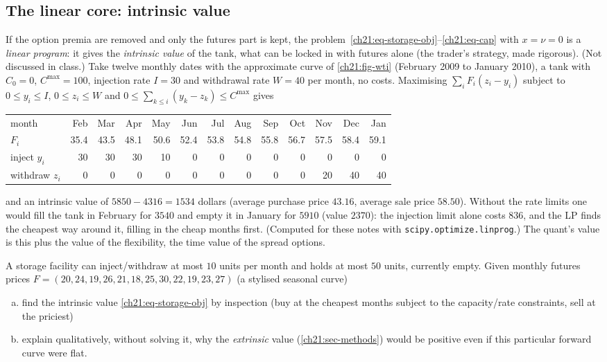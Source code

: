 \begin{paracol}{2}
\subsection{The linear core: intrinsic value}\label{ch21:sec-intrinsic}
If the option premia are removed and only the futures part is kept, the problem~\eqref{ch21:eq-storage-obj}--\eqref{ch21:eq-cap} with $x=\nu=0$ is a \emph{linear program}: it gives the \emph{intrinsic value} of the tank, what can be locked in with futures alone
(the trader's strategy, made rigorous). (Not discussed in class.) Take twelve monthly dates with the approximate curve of \cref{ch21:fig-wti} (February 2009 to January 2010), a tank with $C_0=0$, $C^{\max}=100$, injection rate $I=30$ and withdrawal rate $W=40$ per month,
no costs. Maximising $\sum_iF_i(z_i-y_i)$ subject to $0\le y_i\le I$, $0\le z_i\le W$ and $0\le\sum_{k\le i}(y_k-z_k)\le C^{\max}$ gives
\begin{center}
\footnotesize
\setlength{\tabcolsep}{3.2pt}
\begin{tabular}{@{}l r r r r r r r r r r r r@{}}
\toprule
month & Feb & Mar & Apr & May & Jun & Jul & Aug & Sep & Oct & Nov & Dec & Jan\\
$F_i$ & 35.4 & 43.5 & 48.1 & 50.6 & 52.4 & 53.8 & 54.8 & 55.8 & 56.7 & 57.5 & 58.4 & 59.1\\
inject $y_i$ & 30 & 30 & 30 & 10 & 0 & 0 & 0 & 0 & 0 & 0 & 0 & 0\\
withdraw $z_i$ & 0 & 0 & 0 & 0 & 0 & 0 & 0 & 0 & 0 & 20 & 40 & 40\\
\bottomrule
\end{tabular}
\end{center}
and an intrinsic value of $5850-4316=1534$ dollars (average purchase price $43.16$, average sale price $58.50$). Without the rate limits one would fill the tank in February for $3540$ and empty it in January for $5910$ (value $2370$): the injection limit alone
costs $836$, and the LP finds the cheapest way around it, filling in the cheap months first. (Computed for these notes with \texttt{scipy.optimize.linprog}.) The quant's value is this plus the value of the flexibility, the time value of the spread options.

\begin{exercise}\label{ch21:ex-intrinsic}
A storage facility can inject/withdraw at most $10$ units per month and holds at most $50$ units, currently empty. Given monthly futures prices
$F=(20,24,19,26,21,18,25,30,22,19,23,27)$ (a stylised seasonal curve)
\begin{enumerate}[(a)]
  \item find the intrinsic value \eqref{ch21:eq-storage-obj} by inspection (buy at the cheapest months
      subject to the capacity/rate constraints, sell at the priciest)
  \item explain qualitatively, without solving it, why the \emph{extrinsic} value (\cref{ch21:sec-methods}) would be
      positive even if this particular forward curve were flat.
\end{enumerate}
\end{exercise}


\end{paracol}
